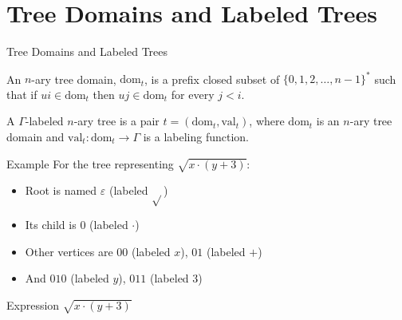 \documentclass[10pt,svgnames,fragile]{beamer}
\begin{document}
\section{Tree Domains and Labeled Trees}

\begin{frame}{Tree Domains and Labeled Trees}
  \begin{definition}
    An $n$-ary tree domain, $\text{dom}_t$, is a prefix closed subset of $\{0,1,2,\ldots,n-1\}^*$ such that if $ui \in \text{dom}_t$ then $uj \in \text{dom}_t$ for every $j < i$.
  \end{definition}
  
  \begin{definition}
    A $\Gamma$-labeled $n$-ary tree is a pair $t = (\text{dom}_t, \text{val}_t)$, where $\text{dom}_t$ is an $n$-ary tree domain and $\text{val}_t : \text{dom}_t \rightarrow \Gamma$ is a labeling function.
  \end{definition}
  
\end{frame}
\newpage
\vspace{20pt}

\begin{frame}{Example}
    For the tree representing $\sqrt{x \cdot (y + 3)}$:
    \begin{center}
    \begin{minipage}{0.5\textwidth}
    
    \begin{itemize}
      \item Root is named $\varepsilon$ (labeled $\sqrt{}$)
      \item Its child is $0$ (labeled $\cdot$)
      \item Other vertices are $00$ (labeled $x$), $01$ (labeled $+$)
      \item And $010$ (labeled $y$), $011$ (labeled $3$)
    \end{itemize}
\end{minipage}
\hfill
\begin{minipage}{0.4\textwidth}
        \begin{center}
        
        Expression $\sqrt{x \cdot (y + 3)}$
      \end{center}
\end{minipage}
\end{center}
\end{frame}
\end{document}
